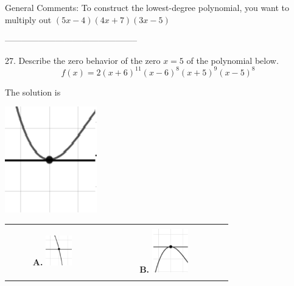 \documentclass{extbook}[14pt]
\begin{document}
General Comments: To construct the lowest-degree polynomial, you want to multiply out $(5x -4)(4x + 7)(3x -5)$

-----------------------------------------------

27. Describe the zero behavior of the zero $x = 5$ of the polynomial below.
\[ f(x) = 2(x + 6)^{11}(x - 6)^{8}(x + 5)^{9}(x - 5)^{8} \] 

 
 The solution is  
 \begin{center} \includegraphics[width=0.3\textwidth]{../Figures/polyZeroBehaviorCA.png} \end{center}\begin{tabular}{|c|c|} 
\hline 
 & \tabularnewline 
 \textbf{A.} \includegraphics[width=0.3\textwidth]{../Figures/polyZeroBehaviorAA.png} & \textbf{B.} \includegraphics[width=0.3\textwidth]{../Figures/polyZeroBehaviorBA.png} \tabularnewline 
\hline 
 & \tabularnewline 

\end{tabular}
\end{document}
